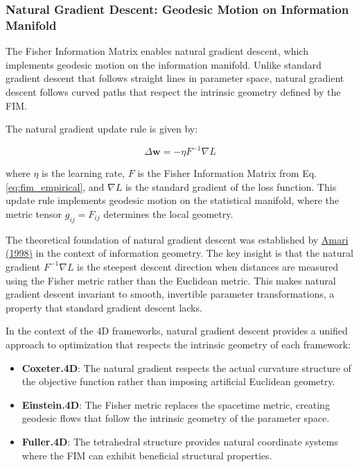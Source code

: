 \documentclass[
  10pt,
]{article}
\providecommand{\tightlist}{%
  \setlength{\itemsep}{0pt}\setlength{\parskip}{0pt}}
\begin{document}
\hypertarget{natural-gradient-descent-geodesic-motion-on-information-manifold}{%
\subsubsection{Natural Gradient Descent: Geodesic Motion on Information
Manifold}\label{natural-gradient-descent-geodesic-motion-on-information-manifold}}

The Fisher Information Matrix enables natural gradient descent, which
implements geodesic motion on the information manifold. Unlike standard
gradient descent that follows straight lines in parameter space, natural
gradient descent follows curved paths that respect the intrinsic
geometry defined by the FIM.

The natural gradient update rule is given by:

\begin{equation}\label{eq:natural_gradient}
\Delta \mathbf{w} = -\eta F^{-1}\nabla L
\end{equation}

where \(\eta\) is the learning rate, \(F\) is the Fisher Information
Matrix from Eq. \eqref{eq:fim_empirical}, and \(\nabla L\) is the
standard gradient of the loss function. This update rule implements
geodesic motion on the statistical manifold, where the metric tensor
\(g_{ij} = F_{ij}\) determines the local geometry.

The theoretical foundation of natural gradient descent was established
by \href{https://en.wikipedia.org/wiki/Natural_gradient}{Amari (1998)}
in the context of information geometry. The key insight is that the
natural gradient \(F^{-1}\nabla L\) is the steepest descent direction
when distances are measured using the Fisher metric rather than the
Euclidean metric. This makes natural gradient descent invariant to
smooth, invertible parameter transformations, a property that standard
gradient descent lacks.

In the context of the 4D frameworks, natural gradient descent provides a
unified approach to optimization that respects the intrinsic geometry of
each framework:

\begin{itemize}
\tightlist
\item
  \textbf{Coxeter.4D}: The natural gradient respects the actual
  curvature structure of the objective function rather than imposing
  artificial Euclidean geometry.
\item
  \textbf{Einstein.4D}: The Fisher metric replaces the spacetime metric,
  creating geodesic flows that follow the intrinsic geometry of the
  parameter space.
\item
  \textbf{Fuller.4D}: The tetrahedral structure provides natural
  coordinate systems where the FIM can exhibit beneficial structural
  properties.
\end{itemize}
\end{document}
